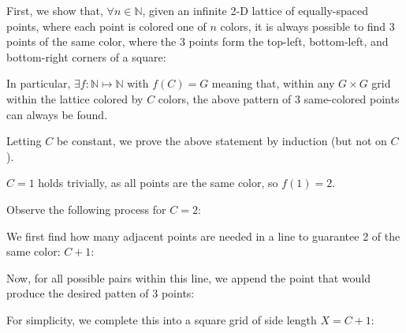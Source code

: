 \documentclass[11pt]{article}
\newcommand{\N}{\mathbb{N}}
\newcommand*{\scalePic}{0.4}
\begin{document}
First, we show that, $\forall n\in\N$, given an infinite 2-D lattice of equally-spaced points, where each point is colored one of $n$ colors, it is always possible to find 3 points of the same color, where the 3 points form the top-left, bottom-left, and bottom-right corners of a square:

\begin{center}
\end{center}

In particular, $\exists f : \N \mapsto \N$ with $f(C) = G$ meaning that, within any $G \times G$ grid within the lattice colored by $C$ colors, the above pattern of 3 same-colored points can always be found.

Letting $C$ be constant, we prove the above statement by induction (but not on $C$).

$C=1$ holds trivially, as all points are the same color, so $f(1)=2$.

Observe the following process for $C=2$:

We first find how many adjacent points are needed in a line to guarantee 2 of the same color: $C+1$:

\begin{center}
\end{center}

Now, for all possible pairs within this line, we append the point that would produce the desired patten of 3 points:

\begin{center}
\end{center}

For simplicity, we complete this into a square grid of side length $X=C+1$:

\begin{center}
\end{center}
\end{document}
